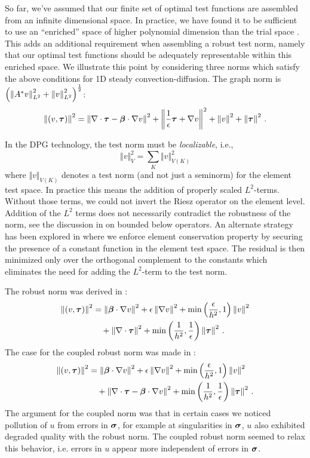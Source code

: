 \documentclass[Dissertation.tex]{subfiles}
\begin{document}
So far, we've assumed that our finite set of optimal test functions are assembled from an infinite dimensional space.
In practice, we have found it to be sufficient to use an ``enriched'' space of higher
polynomial dimension than the trial space \cite{PracticalDPG}.
This adds an additional requirement when assembling a robust test norm, namely that our optimal test functions should be adequately representable within this enriched space.
We illustrate this point by considering three norms which satisfy the above conditions for 1D steady convection-diffusion.
The graph norm is $\left( \left\| A^*v \right\|_{L^2}^2+\left\| v \right\|_{L^2}^2 \right)^{\frac{1}{2}}$:
\begin{equation*}
\left\| (v,\boldsymbol\tau) \right\|^2=
\left\| \nabla\cdot\boldsymbol\tau-\boldsymbol\beta\cdot\nabla v \right\|^2
+\left\| \frac{1}{\epsilon}\boldsymbol\tau+\nabla v \right\|^2
+\left\| v \right\|^2
+\left\| \boldsymbol\tau \right\|^2\,.
\end{equation*}
\begin{remark}
In the DPG technology, the test norm must be {\em localizable}, i.e.,
$$
\Vert v \Vert^2_{V} = \sum_{K} \Vert v \Vert^2_{V(K)}
$$
where $\Vert v \Vert_{V(K)}$ denotes a test norm (and not just a seminorm) for the
element test space. In practice this means the addition of properly scaled $L^2$-terms.
Without those terms, we could not invert the Riesz operator on the element level.
Addition of the $L^2$ terms does not necessarily contradict the robustness of the norm,
see the discussion in \cite{DPGEncyclopedia} on bounded below operators. An alternate
strategy has been explored in \cite{EllisLC} where we enforce element conservation
property 
by securing the presence of a constant function in the element test space. The residual
is then minimized only over the orthogonal complement to the constants which eliminates
the need for adding the $L^2$-term to the test norm.
\end{remark}
The robust norm was derived in \cite{ChanHeuerThanhDemkowicz2012}:
\begin{align*}
\left\| (v,\boldsymbol\tau) \right\|^2&=
\left\| \boldsymbol\beta\cdot\nabla v \right\|^2
+\epsilon\left\| \nabla v \right\|^2
+\min\left( \frac{\epsilon}{h^2},1 \right)\left\| v \right\|^2
\\&\quad
+\left\| \nabla\cdot\boldsymbol\tau \right\|^2
+\min\left( \frac{1}{h^2},\frac{1}{\epsilon} \right)\left\| \boldsymbol\tau \right\|^2\,.
\end{align*}
The case for the coupled robust norm was made in \cite{JesseDissertation}:
\begin{align*}
\left\| (v,\boldsymbol\tau) \right\|^2&=
\left\| \boldsymbol\beta\cdot\nabla v \right\|^2
+\epsilon\left\| \nabla v \right\|^2
+\min\left( \frac{\epsilon}{h^2},1 \right)\left\| v \right\|^2
\\&\quad
+\left\| \nabla\cdot\boldsymbol\tau-\boldsymbol\beta\cdot\nabla v \right\|^2
+\min\left( \frac{1}{h^2},\frac{1}{\epsilon} \right)\left\| \boldsymbol\tau \right\|^2\,.
\end{align*}
The argument for the coupled norm was that in certain cases we noticed pollution of $u$ from errors in $\boldsymbol\sigma$,
for example at singularities in $\boldsymbol\sigma$, $u$ also exhibited degraded quality with the robust norm. 
The coupled robust norm seemed to relax this behavior, i.e. errors in $u$ appear more independent of errors in $\boldsymbol\sigma$.
\end{document}
